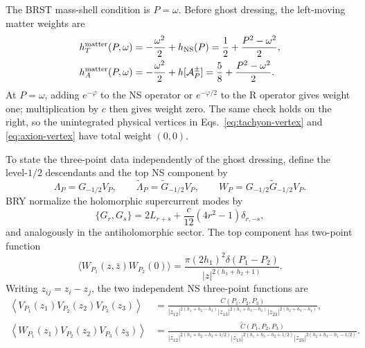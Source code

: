 \documentclass[11pt]{article}
\begin{document}
The BRST mass-shell condition is $P=\omega$.  Before ghost dressing, the
left-moving matter weights are
\begin{align}
 h_T^{\rm matter}(P,\omega)
 &=-\frac{\omega^2}{2}+h_{\rm NS}(P)
 =\frac12+\frac{P^2-\omega^2}{2},\notag\\
 h_A^{\rm matter}(P,\omega)
 &=-\frac{\omega^2}{2}+h[\mathcal A_P^\pm]
 =\frac58+\frac{P^2-\omega^2}{2}.
 \label{eq:physical-matter-weight-audit}
\end{align}
At $P=\omega$, adding $e^{-\varphi}$ to the NS operator or
$e^{-\varphi/2}$ to the R operator gives weight one; multiplication by
$c$ then gives weight zero.  The same check holds on the right, so the
unintegrated physical vertices in Eqs.~\eqref{eq:tachyon-vertex} and
\eqref{eq:axion-vertex} have total weight $(0,0)$.

To state the three-point data independently of the ghost dressing, define
the level-$1/2$ descendants and the top NS component by
\begin{equation}
 \Lambda_P=G_{-1/2}V_P,
 \qquad
 \widetilde\Lambda_P=\widetilde G_{-1/2}V_P,
 \qquad
 W_P=G_{-1/2}\widetilde G_{-1/2}V_P.
 \label{eq:top-ns-component}
\end{equation}
BRY normalize the holomorphic supercurrent modes by
\begin{equation}
 \{G_r,G_s\}=2L_{r+s}
 +\frac{c}{12}(4r^2-1)\delta_{r,-s},
 \label{eq:sca-normalization}
\end{equation}
and analogously in the antiholomorphic sector.
The top component has two-point function
\begin{equation}
 \langle W_{P_1}(z,\bar z)W_{P_2}(0)\rangle
 =\frac{\pi(2h_1)^2\delta(P_1-P_2)}
 {|z|^{2(h_1+h_2+1)}}.
 \label{eq:top-ns-two-point}
\end{equation}
Writing $z_{ij}=z_i-z_j$, the two independent NS three-point functions are
\begin{align}
 \left\langle V_{P_1}(z_1)V_{P_2}(z_2)V_{P_3}(z_3)\right\rangle
 &=\frac{C(P_1,P_2,P_3)}
 {|z_{12}|^{2(h_1+h_2-h_3)}
  |z_{13}|^{2(h_1+h_3-h_2)}
  |z_{23}|^{2(h_2+h_3-h_1)}},
 \label{eq:ns-primary-three-point}\\
\left\langle W_{P_1}(z_1)V_{P_2}(z_2)V_{P_3}(z_3)\right\rangle
&=\frac{\widetilde C(P_1,P_2,P_3)}
 {|z_{12}|^{2(h_1+h_2-h_3+1/2)}
  |z_{13}|^{2(h_1+h_3-h_2+1/2)}
 |z_{23}|^{2(h_2+h_3-h_1-1/2)}}.
 \label{eq:ns-top-three-point}
\end{align}
\end{document}
